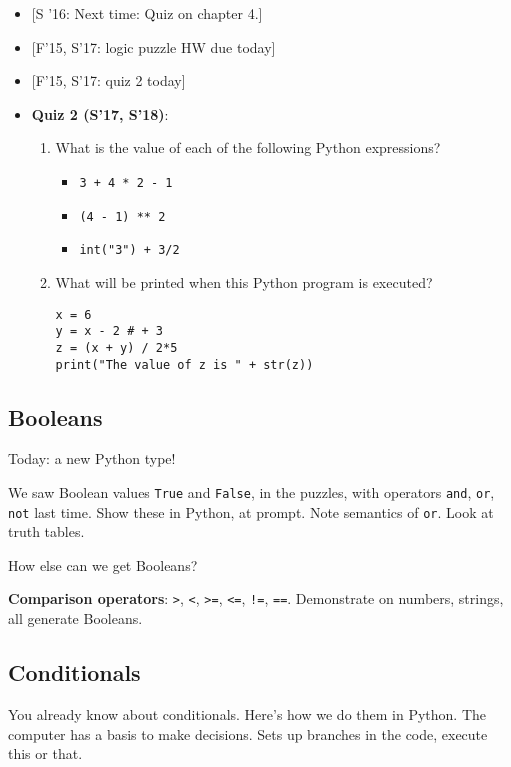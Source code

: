 \documentclass{article}
\begin{document}
\begin{itemize}
\item{} [S '16: Next time: Quiz on chapter 4.]
\item{} [F'15, S'17: logic puzzle HW due today]
\item{} [F'15, S'17: quiz 2 today]
\item \textbf{Quiz 2 (S'17, S'18)}:
  \begin{enumerate}
  \item What is the value of each of the following
    Python expressions?
    \begin{itemize}
    \item \verb|3 + 4 * 2 - 1|
    \item \verb|(4 - 1) ** 2|
    \item \verb|int("3") + 3/2|
    \end{itemize}

  \item What will be printed when this Python program is executed?

\begin{verbatim}
x = 6
y = x - 2 # + 3
z = (x + y) / 2*5
print("The value of z is " + str(z))
\end{verbatim}
  \end{enumerate}

\end{itemize}

\subsection*{Booleans}

Today: a new Python type!

We saw Boolean values {\tt True} and {\tt False}, in the puzzles, with
operators {\tt and}, {\tt or}, {\tt not} last time.  Show these in
Python, at prompt.  Note semantics of {\tt or}.  Look at truth tables.

How else can we get Booleans?

\textbf{Comparison operators}: \verb|>|, \verb|<|, \verb|>=|,
\verb|<=|, \verb|!=|, \verb|==|.  Demonstrate on numbers, strings, all
generate Booleans.

\subsection*{Conditionals}

You already know about conditionals.  Here's how we do them in Python.
The computer has a basis to make decisions.  Sets up branches in the
code, execute this or that.
\end{document}
